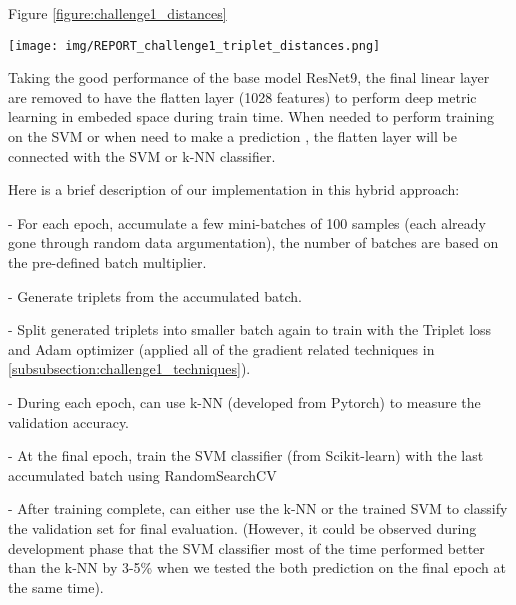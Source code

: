 \documentclass[10pt,twocolumn,letterpaper]{article}
\begin{document}
Figure \ref{figure:challenge1_distances}

 \begin{figure*}[h!]
   \centering
       \texttt{[image: img/REPORT\_challenge1\_triplet\_distances.png]}
   \caption{Visualization in 2D of input's embed space at the beging and after training completed for the hybrid approach in challenge 1. Left: distances at epoch 1 - Right: distances of after the final epoch - Top: PCA transformation - Bottom: T-SNE transformation. The triplet loss function helped push embeded points from different class away from each other, increased the classification chance for SVM, another margin-based optimization classifier.\label{figure:challenge1_distances}}
 \end{figure*}

Taking the good performance of the base model ResNet9, the final linear layer are removed to have the flatten layer (1028 features) to perform deep metric learning in embeded space during train time. When needed to perform training on the SVM or when need to make a prediction , the flatten layer will be connected with the SVM or k-NN classifier.

Here is a brief description of our implementation in this hybrid approach:

\hspace{0.2cm}- For each epoch, accumulate a few mini-batches of 100 samples (each already gone through random data argumentation), the number of batches are based on the pre-defined batch multiplier.

\hspace{0.2cm}- Generate triplets from the accumulated batch.

\hspace{0.2cm}- Split generated triplets into smaller batch again to train with the Triplet loss and Adam optimizer (applied all of the gradient related techniques in \ref{subsubsection:challenge1_techniques}).

\hspace{0.2cm}- During each epoch, can use k-NN (developed from Pytorch) to measure the validation accuracy.

\hspace{0.2cm}- At the final epoch, train the SVM classifier (from Scikit-learn) with the last accumulated batch using RandomSearchCV

\hspace{0.2cm}- After training complete, can either use the k-NN or the trained SVM to classify the validation set for final evaluation. (However, it could be observed during development phase that the SVM classifier most of the time performed better than the k-NN by 3-5\% when we tested the both prediction on the final epoch at the same time).
\end{document}
